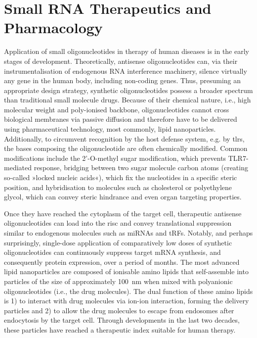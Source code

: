 \section{Small RNA Therapeutics and Pharmacology} \label{sec:discussion:therapy}
Application of small oligonucleotides in therapy of human diseases is in the early stages of development. Theoretically, antisense oligonucleotides can, via their instrumentalisation of endogenous RNA interference machinery, silence virtually any gene in the human body, including non-coding genes. Thus, presuming an appropriate design strategy, synthetic oligonucleotides possess a broader spectrum than traditional small molecule drugs. Because of their chemical nature, i.e., high molecular weight and poly-ionised backbone, oligonucleotides cannot cross biological membranes via passive diffusion and therefore have to be delivered using pharmaceutical technology, most commonly, lipid nanoparticles.\cite{Akhtar2007,Whitehead2009} Additionally, to circumvent recognition by the host defense system, e.g. by \acp{tlr}, the bases composing the oligonucleotide are often chemically modified. Common modifications include the 2'-O-methyl sugar modification, which prevents TLR7-mediated response, bridging between two sugar molecule carbon atoms (creating so-called »locked nucleic acids«), which fix the nucleotides in a specific steric position, and hybridisation to molecules such as cholesterol or polyethylene glycol, which can convey steric hindrance and even organ targeting properties.\cite{Whitehead2009}

Once they have reached the cytoplasm of the target cell, therapeutic antisense oligonucleotides can load into the \acf{risc} and convey translational suppression similar to endogenous molecules such as miRNAs and tRFs. Notably, and perhaps surprisingly, single-dose application of comparatively low doses of synthetic oligonucleotides can continuously suppress target mRNA synthesis, and consequently protein expression, over a period of months.\cite{Raal2020} The most advanced lipid nanoparticles are composed of ionisable amino lipids that self-assemble into particles of the size of approximately \SI{100}{\nano\metre} when mixed with polyanionic oligonucleotides (i.e., the drug molecules).\cite{Akhtar2007} The dual function of these amino lipids is 1) to interact with drug molecules via ion-ion interaction, forming the delivery particles and 2) to allow the drug molecules to escape from endosomes after endocytosis by the target cell. Through developments in the last two decades, these particles have reached a therapeutic index suitable for human therapy.\cite{Jayaraman2012,Raal2020}

